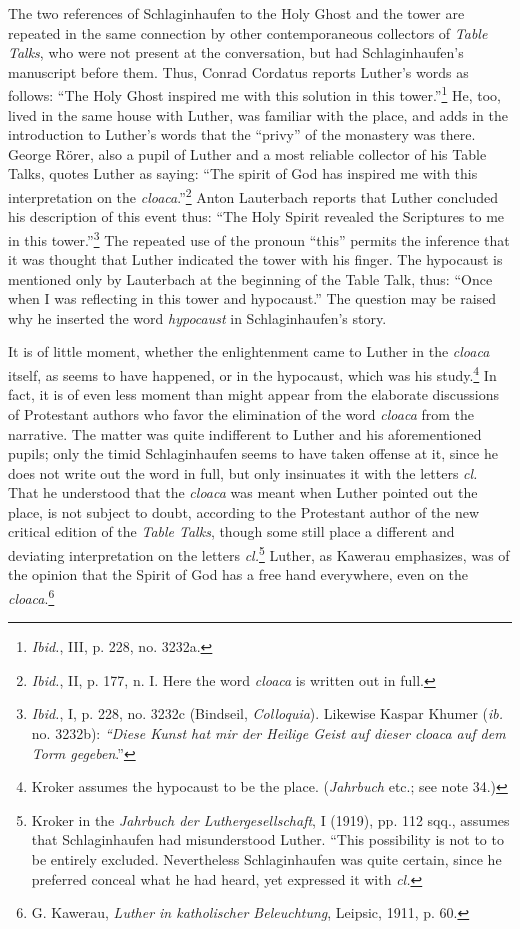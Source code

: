 The two references of Schlaginhaufen to the Holy Ghost and the
tower are repeated in the same connection by other contemporaneous
collectors of \textit{Table Talks}, who were not present at the conversation,
but had Schlaginhaufen’s manuscript before them. Thus, Conrad
Cordatus reports Luther’s words as follows: “The Holy Ghost inspired
me with this solution in this tower.”\footnote{\textit{Ibid.}, III, p. 228, no. 3232a.}
He, too, lived in the same house
with Luther, was familiar with the place, and adds in the introduction
to Luther’s words that the “privy” of the monastery was there. George
Rörer, also a pupil of Luther and a most reliable collector of his Table
Talks, quotes Luther as saying: “The spirit of God has inspired me
with this interpretation on the \textit{cloaca}.”\footnote
{\textit{Ibid.}, II, p. 177, n. I. Here the word \textit{cloaca} is written out in full.}
Anton Lauterbach reports
that Luther concluded his description of this event thus: “The Holy
Spirit revealed the Scriptures to me in this tower.”\footnote
{\textit{Ibid.}, I, p. 228, no. 3232c (Bindseil, \textit{Colloquia}). Likewise Kaspar Khumer (\textit{ib.} no.
3232b): \textit{“Diese Kunst hat mir der Heilige Geist auf dieser cloaca auf dem Torm gegeben}.”}
The repeated
use of the pronoun “this” permits the inference that it was thought
that Luther indicated the tower with his finger. The hypocaust is
mentioned only by Lauterbach at the beginning of the Table Talk,
thus: “Once when I was reflecting in this tower and hypocaust.” The
question may be raised why he inserted the word \textit{hypocaust} in
Schlaginhaufen’s story.

It is of little moment, whether the enlightenment came to Luther
in the \textit{cloaca} itself, as seems to have happened, or in the hypocaust,
which was his study.\footnote{Kroker assumes the hypocaust to be the place. (\textit{Jahrbuch} etc.; see note 34.)}
In fact, it is of even less moment than might
appear from the elaborate discussions of Protestant authors who
favor the elimination of the word \textit{cloaca} from the narrative. The
matter was quite indifferent to Luther and his aforementioned pupils; only
the timid Schlaginhaufen seems to have taken offense at it,
since he does not write out the word in full, but only insinuates it with
the letters \textit{cl.} That he understood that the \textit{cloaca} was meant when
Luther pointed out the place, is not subject to doubt, according to the
Protestant author of the new critical edition of the \textit{Table Talks},
though some still place a different and deviating interpretation on
the letters \textit{cl.}\footnote{Kroker in the \textit{Jahrbuch der
Luthergesellschaft}, I (1919), pp. 112 sqq., assumes that Schlaginhaufen had
misunderstood Luther. “This possibility is not to to be entirely excluded.
Nevertheless Schlaginhaufen was quite certain, since he preferred conceal what he had
heard, yet expressed it with \textit{cl.}}
Luther, as Kawerau emphasizes, was of the opinion
that the Spirit of God has a free hand everywhere, even on the
\textit{cloaca}.\footnote{G. Kawerau, \textit{Luther in katholischer Beleuchtung}, Leipsic, 1911, p. 60.}

